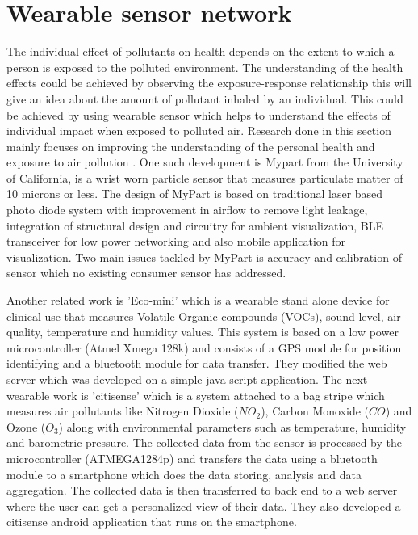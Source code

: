 \section{Wearable sensor network}


The individual effect of pollutants on health depends on the extent to which a person is exposed to the polluted environment. The understanding of the health effects could be achieved by observing the exposure-response relationship \cite{Dons2017} this will give an idea about the amount of pollutant inhaled by an individual. This could be achieved by using wearable sensor which helps to understand the effects of individual impact when exposed to polluted air. Research done in this section mainly focuses on improving the understanding of the personal health and exposure to air pollution \cite{Hu2015}. One such development is Mypart \cite{Tian2016}  from the University of California, is a wrist worn particle sensor that measures particulate matter of 10 microns or less.  The design of MyPart is based on traditional laser based photo diode system with improvement in airflow to remove light leakage, integration of structural design and circuitry for ambient visualization, BLE transceiver for low power networking and also mobile application for visualization. Two main issues tackled by MyPart is accuracy and calibration of sensor which no existing consumer sensor has addressed.

Another related work is 'Eco-mini'\cite{Fletcher2015} which is a wearable stand alone device for clinical use that measures Volatile Organic compounds (VOCs), sound level, air quality, temperature and humidity values. This system is based on a low power microcontroller (Atmel Xmega 128k) and consists of a GPS module for position identifying and a bluetooth module for data transfer. They modified the web server which was developed on a simple java script application. The next wearable work is 'citisense' \cite{Zappi2012} which is a system attached to a bag stripe which measures air pollutants like Nitrogen Dioxide ($NO_2$), Carbon Monoxide ($CO$) and Ozone  ($O_3$) along with environmental parameters such as temperature, humidity and barometric pressure. The collected data from the sensor is processed by the microcontroller (ATMEGA1284p) and transfers the data using a bluetooth module to a smartphone which does the data storing, analysis and data aggregation. The collected data is then transferred to back end to a web server where the user can get a personalized view of their data. They also developed a citisense android application that runs on the smartphone.
 
